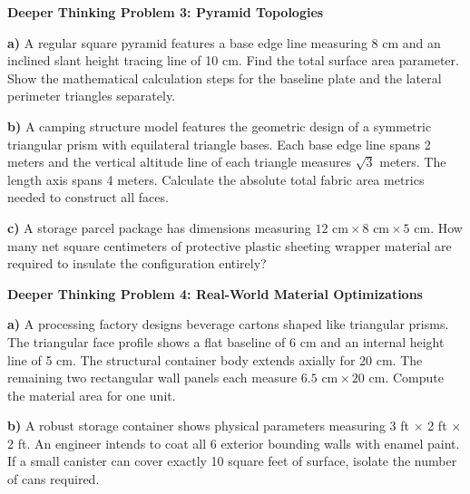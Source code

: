 \documentclass[12pt, letterpaper, fleqn]{article}
\begin{document}
\begin{tcolorbox}[colback=white, colframe=black, boxrule=1pt, arc=4mm, left=6mm, right=6mm, top=5mm, bottom=5mm]
\textbf{Deeper Thinking Problem 3: Pyramid Topologies}

\medskip
\noindent
\textbf{a)} A regular square pyramid features a base edge line measuring 8 cm and an inclined slant height tracing line of 10 cm. Find the total surface area parameter. Show the mathematical calculation steps for the baseline plate and the lateral perimeter triangles separately.
\vspace{4cm}

\noindent
\textbf{b)} A camping structure model features the geometric design of a symmetric triangular prism with equilateral triangle bases. Each base edge line spans 2 meters and the vertical altitude line of each triangle measures $\sqrt{3}$ meters. The length axis spans 4 meters. Calculate the absolute total fabric area metrics needed to construct all faces.
\vspace{5cm}

\noindent
\textbf{c)} A storage parcel package has dimensions measuring $12\text{ cm} \times 8\text{ cm} \times 5\text{ cm}$. How many net square centimeters of protective plastic sheeting wrapper material are required to insulate the configuration entirely?
\vspace{5cm}
\end{tcolorbox}

\vspace{4mm}

\begin{tcolorbox}[colback=white, colframe=black, boxrule=1pt, arc=4mm, left=6mm, right=6mm, top=5mm, bottom=5mm]
\textbf{Deeper Thinking Problem 4: Real-World Material Optimizations}

\medskip
\noindent
\textbf{a)} A processing factory designs beverage cartons shaped like triangular prisms. The triangular face profile shows a flat baseline of 6 cm and an internal height line of 5 cm. The structural container body extends axially for 20 cm. The remaining two rectangular wall panels each measure $6.5\text{ cm} \times 20\text{ cm}$. Compute the material area for one unit.
\vspace{8cm}

\noindent
\textbf{b)} A robust storage container shows physical parameters measuring 3 ft $\times$ 2 ft $\times$ 2 ft. An engineer intends to coat all 6 exterior bounding walls with enamel paint. If a small canister can cover exactly 10 square feet of surface, isolate the number of cans required.
\vspace{8cm}
\end{tcolorbox}
\end{document}
